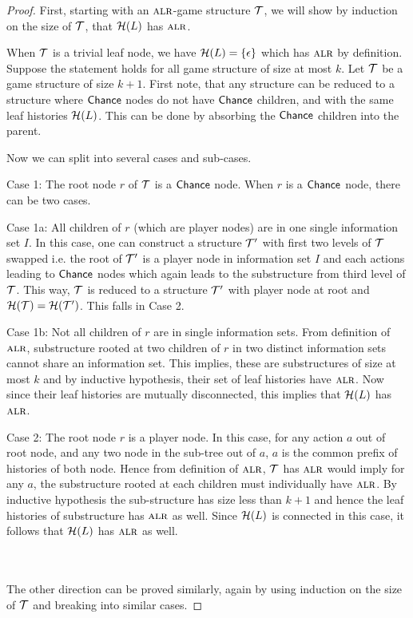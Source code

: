 \alrSetStructEquiv*
\begin{proof}
First, starting with an $\textsc{alr}$-game structure $\mathcal{T}$, we will show by induction on the size of $\mathcal{T}$, that $\mathcal{H}(L)$ has $\textsc{alr}$. 

When $\mathcal{T}$ is a trivial leaf node, we have $\mathcal{H}(L) = \{ \epsilon \}$ which has $\textsc{alr}$ by definition. Suppose the statement holds for all game structure of size at most $k$. 
Let $\mathcal{T}$ be a game structure of size $k+1$. First note, that any structure can be reduced to a structure where $\mathsf{Chance}$ nodes do not have $\mathsf{Chance}$ children, and with the same leaf histories $\mathcal{H}(L)$. This can be done by absorbing the $\mathsf{Chance}$ children into the parent.

Now we can split into several cases and sub-cases.


Case 1: The root node $r$ of $\mathcal{T}$ is a $\mathsf{Chance}$ node. When $r$ is a $\mathsf{Chance}$ node, there can be two cases.

Case 1a: All children of $r$ (which are player nodes) are in one single information set $I$. In this case, one can construct a structure $\mathcal{T}'$ with first two levels of $\mathcal{T}$ swapped i.e. the root of $\mathcal{T}'$ is a player node in information set $I$ and each actions leading to $\mathsf{Chance}$ nodes which again leads to the substructure from third level of $\mathcal{T}$. This way, $\mathcal{T}$ is reduced to a structure $\mathcal{T}'$ with player node at root and $\mathcal{H}(\mathcal{T}) = \mathcal{H}(\mathcal{T}')$. This falls in Case 2.

Case 1b: Not all children of $r$ are in single information sets. From definition of $\textsc{alr}$, substructure rooted at two children of $r$ in two distinct information sets cannot share an information set. This implies, these are substructures of size at most $k$ and by inductive hypothesis, their set of leaf histories have $\textsc{alr}$. Now since their leaf histories are mutually disconnected, this implies that $\mathcal{H}(L)$ has $\textsc{alr}$.

Case 2: The root node $r$ is a player node.
In this case, for any action $a$ out of root node, and any two node in the sub-tree out of $a$, $a$ is the common prefix of histories of both node. Hence from definition of $\textsc{alr}$, $\mathcal{T}$ has $\textsc{alr}$ would imply for any $a$, the substructure rooted at each children must individually have $\textsc{alr}$. By inductive hypothesis the sub-structure has size less than $k+1$ and hence the leaf histories of substructure has $\textsc{alr}$ as well. Since $\mathcal{H}(L)$ is connected in this case, it follows that $\mathcal{H}(L)$ has $\textsc{alr}$ as well. 

~\\
~\\ 
The other direction can be proved similarly, again by using induction on the size of $\mathcal{T}$ and breaking into similar cases.  
\end{proof}
